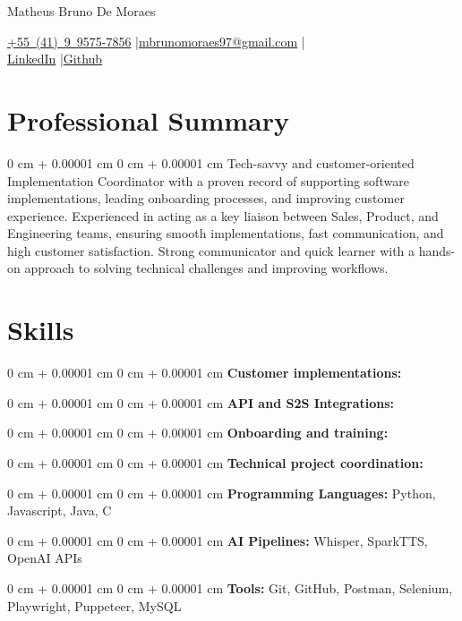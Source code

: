 \documentclass[10pt, letterpaper]{article}
\newenvironment{onecolentry}{
    \begin{adjustwidth}{
        0 cm + 0.00001 cm
    }{
        0 cm + 0.00001 cm
    }
}{
    \end{adjustwidth}
}
\newenvironment{header}{
    \setlength{\topsep}{0pt}\par\kern\topsep\centering\linespread{1.5}
}{
    \par\kern\topsep
}
\begin{document}
\begin{header}
    {\fontsize{25pt}{25pt}\selectfont Matheus Bruno De Moraes}

    \vspace{0pt}

    \normalsize
    \mbox{\href{tel:+55(41)995757856}{+55 (41) 9 9575-7856}} \enskip|\enskip \mbox{\href{mailto:mbrunomoraes97@gmail.com}{mbrunomoraes97@gmail.com}} \enskip|\enskip \mbox{} \\
    \mbox{\href{}{LinkedIn}} \enskip|\enskip \mbox{\href{}{Github}}
\end{header}

\vspace{5pt - 0.1cm}

\section{Professional Summary}
\begin{onecolentry}{Tech-savvy and customer-oriented Implementation Coordinator with a proven record of supporting software implementations, leading onboarding processes, and improving customer experience. Experienced in acting as a key liaison between Sales, Product, and Engineering teams, ensuring smooth implementations, fast communication, and high customer satisfaction. Strong communicator and quick learner with a hands-on approach to solving technical challenges and improving workflows.}\end{onecolentry}
\section{Skills}
\begin{onecolentry}{\textbf{Customer implementations:} }\end{onecolentry}
\vspace{0.1cm}
\begin{onecolentry}{\textbf{API and S2S Integrations:} }\end{onecolentry}
\vspace{0.1cm}
\begin{onecolentry}{\textbf{Onboarding and training:} }\end{onecolentry}
\vspace{0.1cm}
\begin{onecolentry}{\textbf{Technical project coordination:} }\end{onecolentry}
\vspace{0.1cm}
\begin{onecolentry}{\textbf{Programming Languages:} Python, Javascript, Java, C}\end{onecolentry}
\vspace{0.1cm}
\begin{onecolentry}{\textbf{AI Pipelines:} Whisper, SparkTTS, OpenAI APIs}\end{onecolentry}
\vspace{0.1cm}
\begin{onecolentry}{\textbf{Tools:} Git, GitHub, Postman, Selenium, Playwright, Puppeteer, MySQL}\end{onecolentry}
\end{document}
